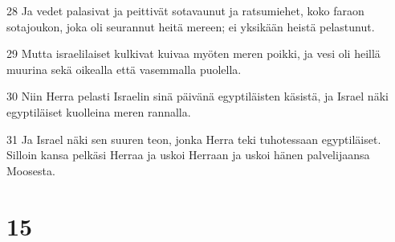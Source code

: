 \par 28 Ja vedet palasivat ja peittivät sotavaunut ja ratsumiehet, koko faraon sotajoukon, joka oli seurannut heitä mereen; ei yksikään heistä pelastunut.
\par 29 Mutta israelilaiset kulkivat kuivaa myöten meren poikki, ja vesi oli heillä muurina sekä oikealla että vasemmalla puolella.
\par 30 Niin Herra pelasti Israelin sinä päivänä egyptiläisten käsistä, ja Israel näki egyptiläiset kuolleina meren rannalla.
\par 31 Ja Israel näki sen suuren teon, jonka Herra teki tuhotessaan egyptiläiset. Silloin kansa pelkäsi Herraa ja uskoi Herraan ja uskoi hänen palvelijaansa Moosesta.

\chapter{15}

